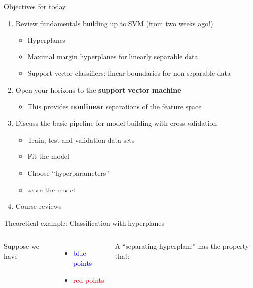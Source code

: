 \documentclass[mathserif, aspectratio=169]{beamer}
\begin{document}
\begin{frame}{Objectives for today}
	\begin{enumerate}
		\item Review fundamentals building up to SVM (from two weeks ago!)
		      \begin{itemize}
			      \item Hyperplanes
			      \item Maximal margin hyperplanes for linearly separable data
			      \item Support vector classifiers: linear boundaries for non-separable data
		      \end{itemize}
		\item Open your horizons to the \textbf{support vector machine}
		      \begin{itemize}
			      \item This provides \textbf{nonlinear} separations of the feature space
		      \end{itemize}
	    \item Discuss the basic pipeline for model building with cross validation
	    \begin{itemize}
	    	\item Train, test and validation data sets
	    	\item Fit the model
	    	\item Choose ``hyperparameters''
	    	\item score the model
    	\end{itemize}
    	\item Course reviews
	\end{enumerate}

\end{frame}


\begin{frame}{Theoretical example: Classification with hyperplanes}
	\begin{columns}
		Suppose we have
		\begin{itemize}
			\item \textcolor{blue}{blue points}
			\item \textcolor{red}{red points}
		\end{itemize}
		\vspace{10mm}
		A ``separating hyperplane'' has the property that:


	\end{columns}

\end{frame}
\end{document}
